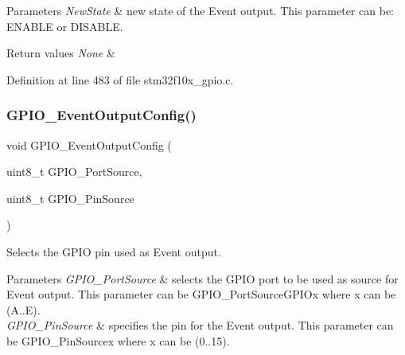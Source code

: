 \begin{DoxyParams}{Parameters}
{\em New\+State} & new state of the Event output. This parameter can be\+: E\+N\+A\+B\+LE or D\+I\+S\+A\+B\+LE. \\
\hline
\end{DoxyParams}

\begin{DoxyRetVals}{Return values}
{\em None} & \\
\hline
\end{DoxyRetVals}


Definition at line 483 of file stm32f10x\+\_\+gpio.\+c.

\mbox{\label{group___g_p_i_o___private___functions_ga935f31ed7a86c6cb594cf34313b4b7af}} 
\subsubsection{\texorpdfstring{G\+P\+I\+O\+\_\+\+Event\+Output\+Config()}{GPIO\_EventOutputConfig()}}
{\footnotesize\ttfamily void G\+P\+I\+O\+\_\+\+Event\+Output\+Config (\begin{DoxyParamCaption}\item[{uint8\+\_\+t}]{G\+P\+I\+O\+\_\+\+Port\+Source,  }\item[{uint8\+\_\+t}]{G\+P\+I\+O\+\_\+\+Pin\+Source }\end{DoxyParamCaption})}



Selects the G\+P\+IO pin used as Event output. 


\begin{DoxyParams}{Parameters}
{\em G\+P\+I\+O\+\_\+\+Port\+Source} & selects the G\+P\+IO port to be used as source for Event output. This parameter can be G\+P\+I\+O\+\_\+\+Port\+Source\+G\+P\+I\+Ox where x can be (A..E). \\
\hline
{\em G\+P\+I\+O\+\_\+\+Pin\+Source} & specifies the pin for the Event output. This parameter can be G\+P\+I\+O\+\_\+\+Pin\+Sourcex where x can be (0..15). \\
\hline
\end{DoxyParams}


